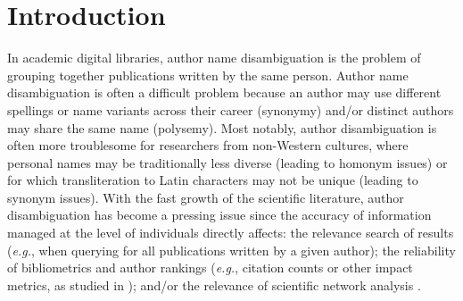 \documentclass[conference]{IEEEtran}
\newcommand{\eg}{\emph{e.g.}\xspace}
\begin{document}
\section{Introduction}
In academic digital libraries, author name disambiguation is the problem of
grouping together publications written by the same person.
Author name disambiguation is often a difficult problem because an author may use different
spellings or name variants across their career (synonymy) and/or distinct authors may
share the same name (polysemy).
Most notably, author disambiguation is often more troublesome for researchers
from non-Western cultures, where personal names may be traditionally less diverse (leading to
homonym issues) or for which transliteration to Latin characters may not be unique (leading to
synonym issues).
With the fast growth of the scientific literature, author disambiguation has become a pressing
issue since the accuracy of information managed at the level of individuals directly affects:
the relevance search of results (\eg, when querying for all publications written by a given author);
the reliability of bibliometrics and author rankings (\eg, citation counts or other impact
metrics, as studied in \cite{strotmann2012author}); and/or the relevance of scientific network analysis
\cite{newman2001structure}.
\end{document}
